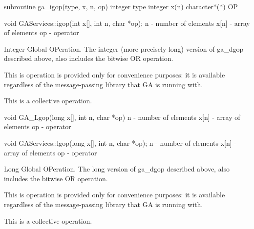 \documentclass[12pt]{article}
\begin{document}
\begin{fapi}
subroutine ga_igop(type, x, n, op)
   integer type                                                            \access{[input]} 
   integer x(n)                                                             
   character*(*) OP                                                        \access{[input]} 
\end{fapi}

\begin{cxxapi}
void GAServices::igop(int x[], int n, char *op);
   n                 - number of elements                                  \access{[input]}
   x[n]              - array of elements                                   
   op                - operator                                            \access{[input]}
\end{cxxapi}

\begin{desc}

Integer Global OPeration. The integer (more precisely long) version of ga_dgop described above, also includes the bitwise OR operation.

This is operation is provided only for convenience purposes: it is available regardless of the message-passing library that GA is running with.

This is a collective operation.
\end{desc}


\begin{capi}
void GA_Lgop(long x[], int n, char *op)
   n     - number of elements                                              \access{[input]} 
   x[n]  - array of elements                                                
   op    - operator                                                        \access{[input]} 
\end{capi}

\begin{cxxapi}
void GAServices::lgop(long x[], int n, char *op);
   n                 - number of elements                                  \access{[input]}
   x[n]              - array of elements                                   
   op                - operator                                            \access{[input]}
\end{cxxapi}

\begin{desc}

Long Global OPeration. The long version of ga_dgop described above, also includes the bitwise OR operation.

This is operation is provided only for convenience purposes: it is available regardless of the message-passing library that GA is running with.

This is a collective operation.
\end{desc}
\end{document}
